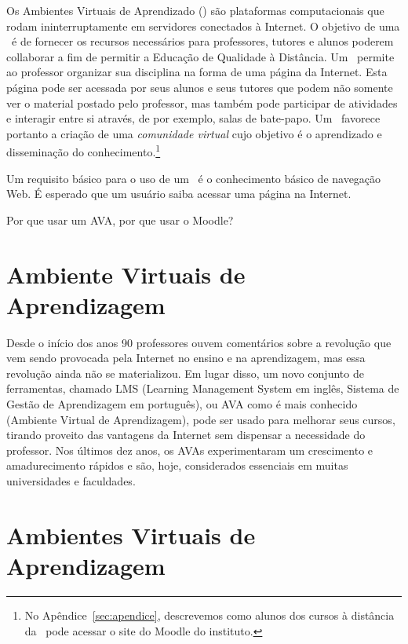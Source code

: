 Os Ambientes Virtuais de Aprendizado (\avas) são plataformas computacionais que rodam ininterruptamente em servidores 
conectados à Internet. O objetivo de uma \ava\ é de fornecer os recursos necessários para professores, tutores 
e alunos poderem collaborar a fim de permitir a Educação de Qualidade à Distância. Um \ava\ permite ao 
professor organizar sua disciplina na forma
de uma página da Internet. Esta página pode ser acessada por seus alunos e seus tutores que podem não somente ver o 
material postado pelo professor, mas também pode participar de atividades e interagir entre si através, de 
por exemplo, salas de bate-papo. Um \ava\ favorece portanto a criação de uma \emph{comunidade virtual} cujo objetivo 
é o aprendizado e disseminação do conhecimento.\footnote{No Apêndice~\ref{sec:apendice}, 
descrevemos como alunos dos cursos à distância da \ufpb\ pode acessar o site do Moodle do instituto.}

Um requisito básico para o uso de um \ava\ é o conhecimento básico de navegação Web. É esperado que um usuário 
saiba acessar uma página na Internet. 

Por que usar um AVA, por que usar o Moodle?

\section{Ambiente Virtuais de Aprendizagem}

Desde o início dos anos 90 professores ouvem comentários sobre a revolução que vem sendo provocada pela Internet no ensino e na aprendizagem, mas essa revolução ainda não se materializou. Em lugar disso, um novo conjunto de ferramentas, chamado LMS (Learning Management System em inglês, Sistema de Gestão de Aprendizagem em português), ou AVA como é mais conhecido (Ambiente Virtual de Aprendizagem), pode ser usado para melhorar seus cursos, tirando proveito das vantagens da Internet sem dispensar a necessidade do professor. Nos últimos dez anos, os AVAs experimentaram um crescimento e amadurecimento rápidos e são, hoje, considerados essenciais em muitas universidades e faculdades.



\section{Ambientes Virtuais de Aprendizagem}

